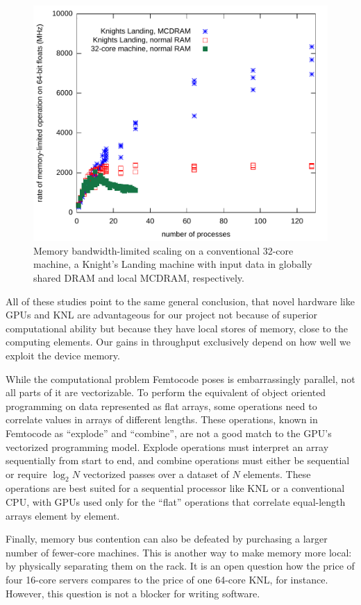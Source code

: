 \documentclass[12pt]{article}
\begin{document}
\begin{figure}[t]
\begin{center}
\includegraphics[width=0.8\linewidth]{knl-scaling.pdf}
\end{center}

\caption{\label{knl-scaling} Memory bandwidth-limited scaling on a conventional 32-core machine, a Knight's Landing machine with input data in globally shared DRAM and local MCDRAM, respectively.}
\end{figure}

All of these studies point to the same general conclusion, that novel hardware like GPUs and KNL are advantageous for our project not because of superior computational ability but because they have local stores of memory, close to the computing elements. Our gains in throughput exclusively depend on how well we exploit the device memory.

While the computational problem Femtocode poses is embarrassingly parallel, not all parts of it are vectorizable. To perform the equivalent of object oriented programming on data represented as flat arrays, some operations need to correlate values in arrays of different lengths. These operations, known in Femtocode as ``explode'' and ``combine'', are not a good match to the GPU's vectorized programming model. Explode operations must interpret an array sequentially from start to end, and combine operations must either be sequential or require $\log_2 N$ vectorized passes over a dataset of $N$ elements. These operations are best suited for a sequential processor like KNL or a conventional CPU, with GPUs used only for the ``flat'' operations that correlate equal-length arrays element by element.

Finally, memory bus contention can also be defeated by purchasing a larger number of fewer-core machines. This is another way to make memory more local: by physically separating them on the rack. It is an open question how the price of four 16-core servers compares to the price of one 64-core KNL, for instance. However, this question is not a blocker for writing software.
\end{document}
